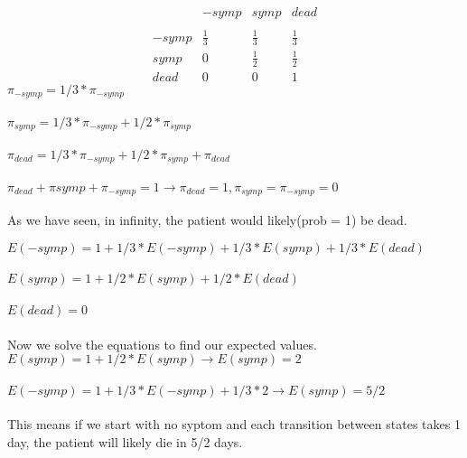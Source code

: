 \usetikzlibrary{automata, positioning}
\begin{latin}
  \noindent
 \begin{equation*}
   \begin{matrix}
         &-symp&symp&dead\\\\
    -symp&\frac{1}{3}&\frac{1}{3}&\frac{1}{3}\\
    symp&0&\frac{1}{2}&\frac{1}{2}\\
    dead&0&0&1
  \end{matrix}
 \end{equation*}
\noindent
 $\pi_{-symp} = 1/3*\pi_{-symp}$\\\\
 $\pi_{symp} = 1/3*\pi_{-symp} + 1/2 *\pi_{symp}$\\\\
 $\pi_{dead} = 1/3 * \pi_{-symp} + 1/2 *\pi_{symp} + \pi_{dead}$\\\\
 $\pi_{dead} + \pi{symp}+\pi_{-symp} = 1 \xrightarrow[]{} \pi_{dead} = 1,\pi_{symp} = \pi_{-symp} = 0$
 \begin{center}
  As we have seen, in infinity, the patient would likely(prob = 1) be dead.
 \end{center}
 \noindent
 $E(-symp) = 1 + 1/3 * E(-symp) + 1/3 * E(symp) + 1/3 * E(dead)$\\\\
 $E(symp) = 1 + 1/2 * E(symp) + 1/2 * E(dead)$\\\\
 $E(dead) = 0$\\\\
 Now we solve the equations to find our expected values.\\
 $E(symp) = 1 + 1/2 * E(symp) \rightarrow E(symp) = 2$\\\\
 $E(-symp) = 1 + 1/3 * E(-symp) + 1/3 * 2 \rightarrow E(symp) = 5/2$\\\\
 This means if we start with no syptom and each transition between states takes 1 day, the patient will likely die in 5/2 days.
\end{latin}